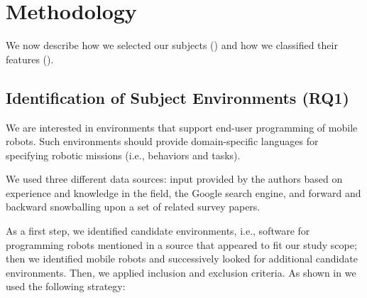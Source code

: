 \section{Methodology}
We now describe how we selected our subjects () and how we classified their features ().
 
\subsection{Identification of Subject Environments (RQ1)}
\label{sec:sel}
We are interested in environments that support end-user programming of mobile robots. Such environments should provide domain-specific languages for specifying robotic missions (i.e., behaviors and tasks). %

We used three different data sources: input provided by the authors based on experience and knowledge in the field, the Google search engine, and forward and backward snowballing upon a set of related survey papers.


As a first step, we identified candidate environments, i.e., software for programming robots mentioned in a source that appeared to fit our study scope; then we identified mobile robots and successively looked for additional candidate environments. Then, we applied inclusion and exclusion criteria.
As shown in  we used the following strategy:

